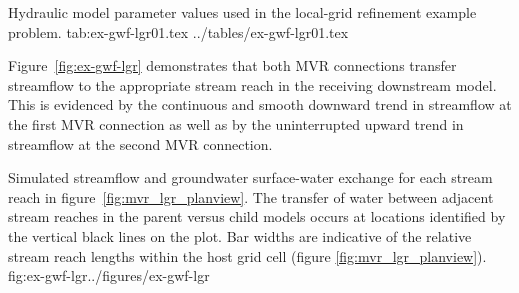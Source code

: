\begin{StandardTable}
	{Hydraulic model parameter values used in the local-grid refinement example problem.}
	{tab:ex-gwf-lgr01.tex}
	{../tables/ex-gwf-lgr01.tex}
\end{StandardTable}

Figure~\ref{fig:ex-gwf-lgr} demonstrates that both MVR connections transfer streamflow to the appropriate stream reach in the receiving downstream model.  This is evidenced by the continuous and smooth downward trend in streamflow at the first MVR connection as well as by the uninterrupted upward trend in streamflow at the second MVR connection.  

\begin{StandardFigure}
	{Simulated streamflow and groundwater surface-water exchange for each stream reach in figure~\ref{fig:mvr_lgr_planview}.  The transfer of water between adjacent stream reaches in the parent versus child models occurs at locations identified by the vertical black lines on the plot. Bar widths are indicative of the relative stream reach lengths within the host grid cell (figure \ref{fig:mvr_lgr_planview}).}
	{fig:ex-gwf-lgr}{../figures/ex-gwf-lgr}
\end{StandardFigure}